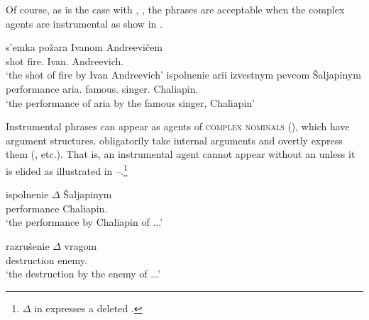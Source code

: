 \documentclass[output=paper,colorlinks,citecolor=brown,newtxmath]{langsci/langscibook}
\begin{document}
\noindent
Of course, as is the case with , , the phrases are acceptable when the complex agents are instrumental as show in .

\begin{exe}
\ex\label{gicom} %
\begin{xlist}
\ex
\gll s'emka požara Ivanom Andreevičem\\
	shot fire.{\GEN}	Ivan.{\INS} Andreevich.{\INS}\\
\trans  `the shot of fire by Ivan Andreevich'
\ex
\gll ispolnenie arii izvestnym	 pevcom Šaljapinym\\
	performance aria.{\GEN} famous.{\INS} singer.{\INS} Chaliapin.{\INS}\\
\trans `the performance of aria by the famous singer, Chaliapin'
\end{xlist}
\end{exe}

\noindent Instrumental phrases can appear as agents of \textsc{complex  nominals} (), which have argument structures.
 obligatorily take internal arguments and overtly express them (\citealt{Revzin1973, Schoorlemmer1998}, etc.).
That is, an instrumental agent cannot appear without an  unless it is elided as illustrated in --.\footnote{
			$\Delta$ in  expresses a deleted .			}

\begin{exe}
\ex\label{II}
\begin{xlist}
\end{xlist}
\end{exe}

\begin{exe}
\ex\label{DI}
\begin{xlist}
\ex\label{ispdI}
\gll ispolnenie $\Delta$ Šaljapinym \\  %
	performance {} Chaliapin.{\INS}\\
\trans `the performance by Chaliapin of ...'

\ex\label{razdI}
\gll razrušenie $\Delta$ vragom\\
	destruction {} enemy.{\INS}\\
\trans `the destruction by the enemy of ...'
\end{xlist}
\end{exe}
\end{document}
